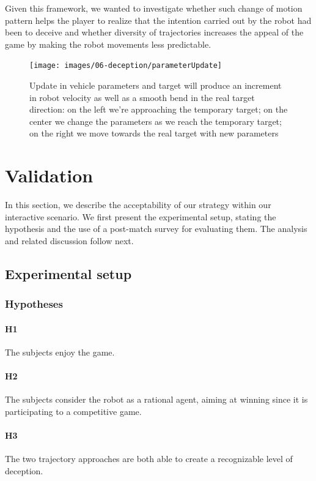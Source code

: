 Given this framework, we wanted to investigate whether such change of motion pattern helps the player to realize that the intention carried out by the robot had been to deceive and whether diversity of trajectories increases the appeal of the game by making the robot movements less predictable.

\begin{figure}[htbp]
    \centering
    \texttt{[image: images/06-deception/parameterUpdate]}
    \caption{Update in vehicle parameters and target will produce an increment in robot velocity as well as a smooth bend in the real target direction: on the left we're approaching the temporary target; on the center we change the parameters as we reach the temporary target; on the right we move towards the real target with new parameters}
    \label{fig::trajectorySteering}
\end{figure}

\section{Validation}
\label{sec:deception_validation}
In this section, we describe the acceptability of our strategy within our interactive scenario. We first present the experimental setup, stating the hypothesis and the use of a post-match survey for evaluating them. The analysis and related discussion follow next. 

\subsection{Experimental setup}
\subsubsection{Hypotheses}

\paragraph{H1} The subjects enjoy the game.
\paragraph{H2} The subjects consider the robot as a rational agent, aiming at winning since it is participating to a competitive game.
\paragraph{H3} The two trajectory approaches are both able to create a recognizable level of deception. 
